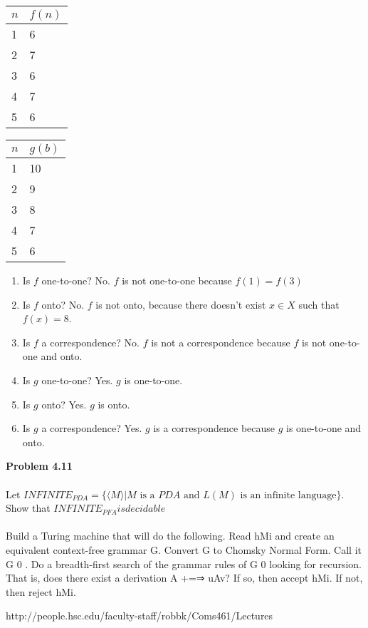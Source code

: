 \documentclass{article}
\newcommand\curl[1]{\{#1\}}
\newcommand{\problem}[1]{\large{\textbf{Problem #1}}\\}
\begin{document}
    \begin{table}[h!]
    \centering
    \begin{tabular}{l|l}
     $n$   & $f(n)$  \\ \hline
     1     & 6 \\
     2     & 7 \\
     3     & 6 \\
     4     & 7 \\
     5     & 6 
    \end{tabular}
    \quad
    \begin{tabular}{l|l}
     $n$& $g(b)$  \\ \hline
     1  & 10 \\
     2  & 9 \\
     3  & 8 \\
     4  & 7 \\
     5  & 6
    \end{tabular}
    \end{table}

    \begin{enumerate}[1., leftmargin = 1.5cm]
    \itemsep0em
    \item Is $f$ one-to-one?
        No. $f$ is not one-to-one because $f(1) = f(3)$
    \item Is $f$ onto?
        No. $f$ is not onto, because there doesn't exist $x \in X$ such that $f(x) = 8$.
    \item Is $f$ a correspondence?
        No. $f$ is not a correspondence because $f$ is not one-to-one and onto.
    \item Is $g$ one-to-one?
        Yes. $g$ is one-to-one.
    \item Is $g$ onto?
        Yes. $g$ is onto.
    \item Is $g$ a correspondence?
        Yes. $g$ is a correspondence because $g$ is one-to-one and onto.
    \end{enumerate}

\pagebreak

\problem{4.11} \\

    Let $INFINITE_{PDA} = \curl{\langle M \rangle | M \text{ is a } PDA \text{ and } L(M) \text{ is an infinite language}}$.
    Show that $INFINITE_{PFA} is decidable$ \\ \\

    Build a Turing machine that will do the following.
    Read hMi and create an equivalent context-free
    grammar G.
    Convert G to Chomsky Normal Form. Call it G
    0
    .
    Do a breadth-first search of the grammar rules of G
    0
    looking for recursion.
    That is, does there exist a derivation A
    +=⇒ uAv?
    If so, then accept hMi.
    If not, then reject hMi.

    http://people.hsc.edu/faculty-staff/robbk/Coms461/Lectures%
\end{document}

